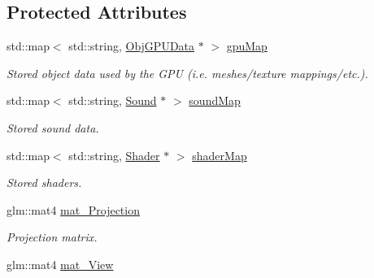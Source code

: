 \subsection*{Protected Attributes}
\begin{DoxyCompactItemize}
\item 
std\+::map$<$ std\+::string, \hyperlink{class_obj_g_p_u_data}{Obj\+G\+P\+U\+Data} $\ast$ $>$ \hyperlink{class_environment_a63e85f9e330d8b15341d74e41445de72}{gpu\+Map}\hypertarget{class_environment_a63e85f9e330d8b15341d74e41445de72}{}\label{class_environment_a63e85f9e330d8b15341d74e41445de72}

\begin{DoxyCompactList}\small\item\em Stored object data used by the G\+PU (i.\+e. meshes/texture mappings/etc.). \end{DoxyCompactList}\item 
std\+::map$<$ std\+::string, \hyperlink{class_sound}{Sound} $\ast$ $>$ \hyperlink{class_environment_a69466b733dc5de97a737179db3622fc4}{sound\+Map}\hypertarget{class_environment_a69466b733dc5de97a737179db3622fc4}{}\label{class_environment_a69466b733dc5de97a737179db3622fc4}

\begin{DoxyCompactList}\small\item\em Stored sound data. \end{DoxyCompactList}\item 
std\+::map$<$ std\+::string, \hyperlink{class_shader}{Shader} $\ast$ $>$ \hyperlink{class_environment_a88eac0ec0201cebf3dba08a7bccfbd9d}{shader\+Map}\hypertarget{class_environment_a88eac0ec0201cebf3dba08a7bccfbd9d}{}\label{class_environment_a88eac0ec0201cebf3dba08a7bccfbd9d}

\begin{DoxyCompactList}\small\item\em Stored shaders. \end{DoxyCompactList}\item 
glm\+::mat4 \hyperlink{class_environment_ab30f0315cb97e5826fe81c2baee9ba2a}{mat\+\_\+\+Projection}\hypertarget{class_environment_ab30f0315cb97e5826fe81c2baee9ba2a}{}\label{class_environment_ab30f0315cb97e5826fe81c2baee9ba2a}

\begin{DoxyCompactList}\small\item\em Projection matrix. \end{DoxyCompactList}\item 
glm\+::mat4 \hyperlink{class_environment_a584ebdf6c3c8590b4d353735b3a9d873}{mat\+\_\+\+View}\hypertarget{class_environment_a584ebdf6c3c8590b4d353735b3a9d873}{}\label{class_environment_a584ebdf6c3c8590b4d353735b3a9d873}


\end{DoxyCompactItemize}
